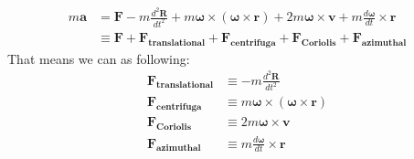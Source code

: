 \documentclass[11pt]{article}
\begin{document}
\begin{equation}
    \begin{aligned}
        m\mathbf{a} &= \mathbf{F} - m\frac{d^2\mathbf{R}}{dt^2} + m\boldsymbol{\omega} \times (\boldsymbol{\omega} \times \mathbf{r}) + 2m\boldsymbol{\omega} \times \mathbf{v} + m\frac{d\boldsymbol{\omega}}{dt} \times \mathbf{r}\\
        &\equiv \mathbf{F} + \mathbf{F_{translational}} + \mathbf{F_{centrifuga}} + \mathbf{F_{Coriolis}} + \mathbf{F_{azimuthal}} 
    \end{aligned}\label{eq:10.10}
\end{equation}
That means we can  as following:
\begin{equation}
    \begin{aligned}
        \mathbf{F_{translational}} &\equiv -m\frac{d^2\mathbf{R}}{dt^2}\\
        \mathbf{F_{centrifuga}} &\equiv m\boldsymbol{\omega} \times (\boldsymbol{\omega} \times \mathbf{r})\\
        \mathbf{F_{Coriolis}} &\equiv 2m\boldsymbol{\omega} \times \mathbf{v}\\
        \mathbf{F_{azimuthal}} &\equiv m\frac{d\boldsymbol{\omega}}{dt} \times \mathbf{r}
    \end{aligned}\label{eq:10.11}
\end{equation}
\end{document}
